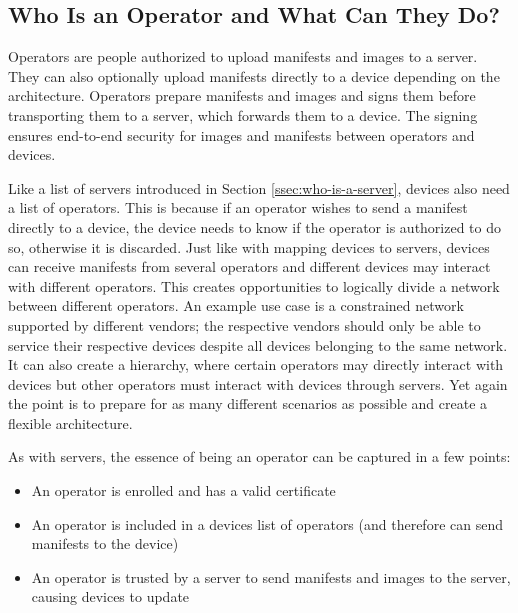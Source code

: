 \documentclass[0-thesis.tex]{subfiles}
\begin{document}
\subsection{Who Is an Operator and What Can They Do?}
\label{ssec:who-is-an-operator}
Operators are people authorized to upload manifests and images to a server. They can also
optionally upload manifests directly to a device depending on the architecture. Operators
prepare manifests and images and signs them before transporting them to a server, which
forwards them to a device. The signing ensures end-to-end security for images and
manifests between operators and devices.

Like a list of servers introduced in Section \ref{ssec:who-is-a-server}, devices also need
a list of operators. This is because if an operator wishes to send a manifest directly to
a device, the device needs to know if the operator is authorized to do so, otherwise it is
discarded. Just like with mapping devices to servers, devices can receive manifests from
several operators and different devices may interact with different operators. This
creates opportunities to logically divide a network between different operators. An
example use case is a constrained network supported by different vendors; the respective
vendors should only be able to service their respective devices despite all devices
belonging to the same network. It can also create a hierarchy, where certain operators may
directly interact with devices but other operators must interact with devices through
servers. Yet again the point is to prepare for as many different scenarios as possible and
create a flexible architecture.

As with servers, the essence of being an operator can be captured in a few points:

\begin{itemize}
    \item An operator is enrolled and has a valid certificate
    \item An operator is included in a devices list of operators (and therefore can send
            manifests to the device)
    \item An operator is trusted by a server to send manifests and images to the server,
            causing devices to update
\end{itemize}
\end{document}

